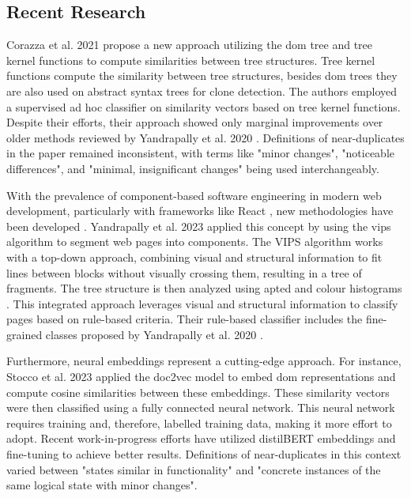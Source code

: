     \subsection{Recent Research}
    
        Corazza et al. 2021 \cite{corazza_web_2021} propose a new approach utilizing the \ac{dom} tree and tree kernel functions to compute similarities between tree structures. Tree kernel functions compute the similarity between tree structures, besides \ac{dom} trees they are also used on abstract syntax trees for clone detection. The authors employed a supervised ad hoc classifier on similarity vectors based on tree kernel functions. Despite their efforts, their approach showed only marginal improvements over older methods reviewed by Yandrapally et al. 2020 \cite{yandrapally_near-duplicate_2020}. Definitions of near-duplicates in the paper remained inconsistent, with terms like "minor changes", "noticeable differences", and "minimal, insignificant changes" being used interchangeably.
        
        With the prevalence of component-based software engineering in modern web development, particularly with frameworks like React \cite{noauthor_technology_nodate}, new methodologies have been developed \cite{vale_twenty-eight_2016,krznar_current_2016}. Yandrapally et al. 2023 \cite{yandrapally_fragment-based_2023} applied this concept by using the \ac{vips} algorithm \cite{cai_vips_2003} to segment web pages into components. The VIPS algorithm works with a top-down approach, combining visual and structural information to fit lines between blocks without visually crossing them, resulting in a tree of fragments. The tree structure is then analyzed using \ac{apted} \cite{pawlik_tree_2016} and colour histograms \cite{swain_indexing_1992}. This integrated approach leverages visual and structural information to classify pages based on rule-based criteria. Their rule-based classifier includes the fine-grained classes proposed by Yandrapally et al. 2020 \cite{yandrapally_near-duplicate_2020}.
        
        Furthermore, neural embeddings represent a cutting-edge approach. For instance, Stocco et al. 2023 \cite{stocco_neural_2023} applied the doc2vec model to embed \ac{dom} representations and compute cosine similarities between these embeddings. These similarity vectors were then classified using a fully connected neural network. This neural network requires training and, therefore, labelled training data, making it more effort to adopt. Recent work-in-progress efforts have utilized distilBERT embeddings and fine-tuning to achieve better results. Definitions of near-duplicates in this context varied between "states similar in functionality" and "concrete instances of the same logical state with minor changes".

